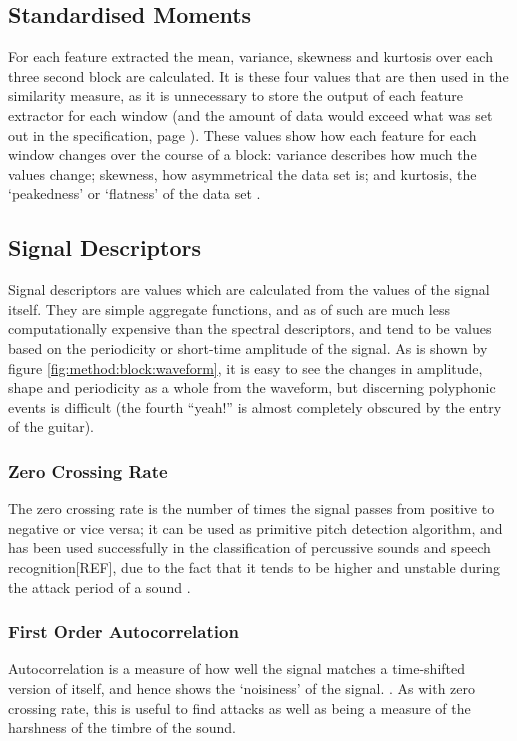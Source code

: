 \subsection{Standardised Moments}
For each feature extracted the mean, variance, skewness and kurtosis over each three second block are calculated. It is these four values that are then used in the similarity measure, as it is unnecessary to store the output of each feature extractor for each window (and the amount of data would exceed what was set out in the specification, page \pageref{text:spec:requirement:data}). These values show how each feature for each window changes over the course of a block: variance describes how much the values change; skewness, how asymmetrical the data set is; and kurtosis, the `peakedness' or `flatness' of the data set \citep{Siegrist2007}.
\subsection{Signal Descriptors}
Signal descriptors are values which are calculated from the values of the signal itself. They are simple aggregate functions, and as of such are much less computationally expensive than the spectral descriptors, and tend to be values based on the periodicity or short-time amplitude of the signal. As is shown by figure \ref{fig:method:block:waveform}, it is easy to see the changes in amplitude, shape and periodicity as a whole from the waveform, but discerning polyphonic events is difficult (the fourth ``yeah!'' is almost completely obscured by the entry of the guitar).
\subsubsection{Zero Crossing Rate}

The zero crossing rate is the number of times the signal passes from positive to negative or vice versa; it can be used as primitive pitch detection algorithm, and has been used successfully in the classification of percussive sounds \citep{Gouyon2000} and speech recognition[REF], due to the fact that it tends to be higher and unstable during the attack period of a sound \citep{Schwarz2004}.
\subsubsection{First Order Autocorrelation}

Autocorrelation is a measure of how well the signal matches a time-shifted version of itself, and hence shows the `noisiness' of the signal. \citep{Wikipedia2007}. As with zero crossing rate, this is useful to find attacks as well as being a measure of the harshness of the timbre of the sound.
